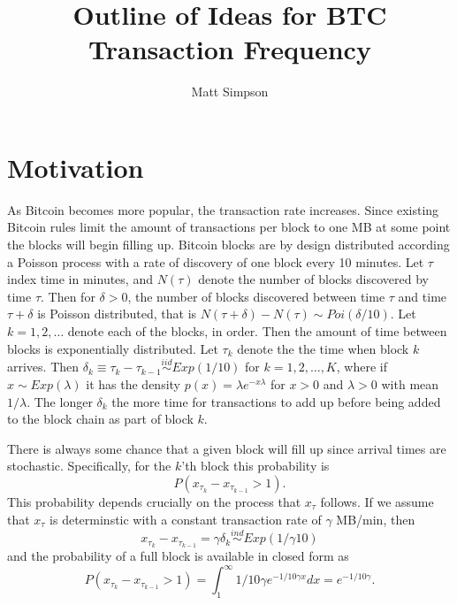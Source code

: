 \documentclass{article}
\author{Matt Simpson}
\title{Outline of Ideas for BTC Transaction Frequency}
\begin{document}
\maketitle




\section{Motivation}
As Bitcoin becomes more popular, the transaction rate increases. Since existing Bitcoin rules limit the amount of transactions per block to one MB at some point the blocks will begin filling up. Bitcoin blocks are by design distributed according a Poisson process with a rate of discovery of one block every 10 minutes. Let $\tau$ index time in minutes, and $N(\tau)$ denote the number of blocks discovered by time $\tau$. Then for $\delta > 0$, the number of blocks discovered between time $\tau$ and time $\tau + \delta$ is Poisson distributed, that is $N(\tau + \delta) - N(\tau) \sim Poi(\delta/10)$. Let $k=1,2,\dots$ denote each of the blocks, in order. Then the amount of time between blocks is exponentially distributed. Let $\tau_k$ denote the the time when block $k$ arrives. Then $\delta_k \equiv \tau_{k} - \tau_{k-1} \stackrel{iid}{\sim} Exp(1/10)$ for $k=1,2,\dots,K$, where if $x\sim Exp(\lambda)$ it has the density $p(x) = \lambda e^{-x\lambda}$ for $x>0$ and $\lambda>0$ with mean $1/\lambda$. The longer $\delta_k$ the more time for transactions to add up before being added to the block chain as part of block $k$.

There is always some chance that a given block will fill up since arrival times are stochastic. Specifically, for the $k$'th block this probability is
\[
P\left(x_{\tau_k} - x_{\tau_{k-1}} > 1\right).
\]
This probability depends crucially on the process that $x_\tau$ follows. If we assume that $x_{\tau}$ is determinstic with a constant transaction rate of $\gamma$ MB/min, then 
\[
x_{\tau_k} - x_{\tau_{k-1}} = \gamma\delta_k \stackrel{ind}{\sim} Exp(1/\gamma 10)
\]
and the probability of a full block is available in closed form as
\[
P\left(x_{\tau_k} - x_{\tau_{k-1}} > 1\right) = \int_1^\infty 1/10\gamma e^{-1/10\gamma x}dx = e^{-1/10\gamma}.
\]
\end{document}
